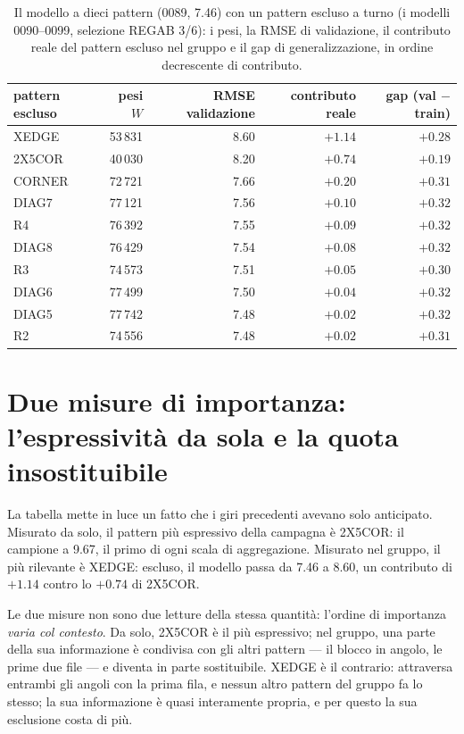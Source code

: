 \begin{table}[ht]
\centering
\begin{tabular}{lrrrr}
\toprule
pattern escluso & pesi $W$ & RMSE validazione & contributo reale & gap (val $-$ train) \\
\midrule
XEDGE   & 53\,831 & 8.60 & $+1.14$ & $+0.28$ \\
2X5COR  & 40\,030 & 8.20 & $+0.74$ & $+0.19$ \\
CORNER  & 72\,721 & 7.66 & $+0.20$ & $+0.31$ \\
DIAG7   & 77\,121 & 7.56 & $+0.10$ & $+0.32$ \\
R4      & 76\,392 & 7.55 & $+0.09$ & $+0.32$ \\
DIAG8   & 76\,429 & 7.54 & $+0.08$ & $+0.32$ \\
R3      & 74\,573 & 7.51 & $+0.05$ & $+0.30$ \\
DIAG6   & 77\,499 & 7.50 & $+0.04$ & $+0.32$ \\
DIAG5   & 77\,742 & 7.48 & $+0.02$ & $+0.32$ \\
R2      & 74\,556 & 7.48 & $+0.02$ & $+0.31$ \\
\bottomrule
\end{tabular}
\caption{Il modello a dieci pattern (0089, 7.46) con un pattern
escluso a turno (i modelli 0090--0099, selezione REGAB 3/6): i
pesi, la RMSE di validazione, il contributo reale del pattern
escluso nel gruppo e il gap di generalizzazione, in ordine
decrescente di contributo.}
\label{tab:decomposizione-contributi}
\end{table}

\section{Due misure di importanza: l'espressività da sola e la
quota insostituibile}

La tabella mette in luce un fatto che i giri precedenti avevano
solo anticipato. Misurato da solo, il pattern più espressivo della
campagna è 2X5COR: il campione a 9.67, il primo di ogni scala di
aggregazione. Misurato nel gruppo, il più rilevante è XEDGE:
escluso, il modello passa da 7.46 a 8.60, un contributo di
$+1.14$ contro lo $+0.74$ di 2X5COR.

Le due misure non sono due letture della stessa quantità:
l'ordine di importanza \emph{varia col contesto}. Da solo, 2X5COR
è il più espressivo; nel gruppo, una parte della sua informazione
è condivisa con gli altri pattern — il blocco in angolo, le prime
due file — e diventa in parte sostituibile. XEDGE è il contrario:
attraversa entrambi gli angoli con la prima fila, e nessun altro
pattern del gruppo fa lo stesso; la sua informazione è quasi
interamente propria, e per questo la sua esclusione costa di più.


